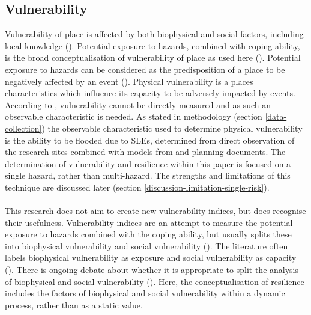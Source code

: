 \subsection{Vulnerability}
Vulnerability of place is affected by both biophysical and social factors, including local knowledge (\cite{opach_seeking_2020}). Potential exposure to hazards, combined with coping ability, is the broad conceptualisation of vulnerability of place as used here (\cite{rygel_method_2006}). Potential exposure to hazards can be considered as the predisposition of a place to be negatively affected by an event (\cite{lujala_quantifying_2014}). Physical vulnerability is a places characteristics which influence its capacity to be adversely impacted by events. According to \cite{rod_integrated_2012}, vulnerability cannot be directly measured and as such an observable characteristic is needed.  As stated in methodology (section \ref{data-collection}) the observable characteristic used to determine physical vulnerability is the ability to be flooded due to SLEs, determined from direct observation of the research sites combined with models from \cite{kartverket_se_2021} and planning documents. The determination of vulnerability and resilience within this paper is focused on a single hazard, rather than multi-hazard. The strengths and limitations of this technique are discussed later (section \ref{discussion-limitation-single-risk}). 
\paragraph{}
This research does not aim to create new vulnerability indices, but does recognise their usefulness. Vulnerability indices are an attempt to measure the potential exposure to hazards combined with the coping ability, but usually splits these into biophysical vulnerability  and social vulnerability (\cite{rod_integrated_2012}). The literature often labels biophysical vulnerability as exposure and social vulnerability as capacity (\cite{rod_integrated_2012}). There is ongoing debate about whether it is appropriate to split the analysis of biophysical and social vulnerability (\cite{lujala_quantifying_2014}). Here, the conceptualisation of resilience includes the factors of biophysical and social vulnerability within a dynamic process, rather than as a static value.

